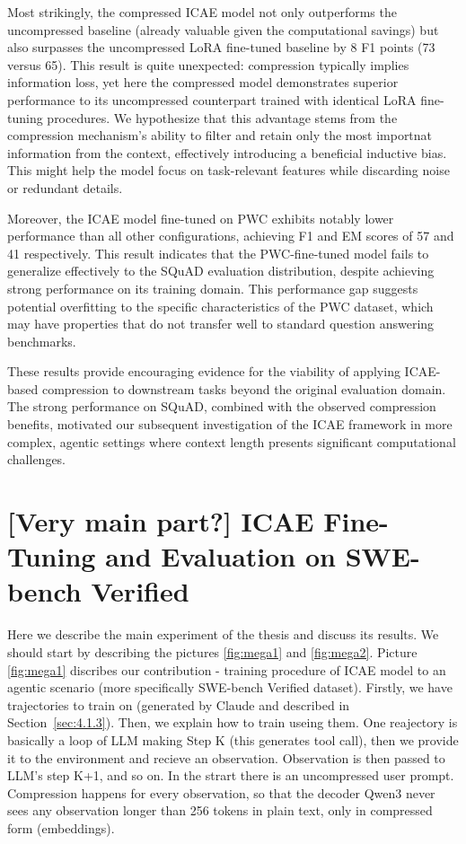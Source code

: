 Most strikingly, the compressed ICAE model not only outperforms the uncompressed baseline (already valuable given the computational savings) but also surpasses the uncompressed LoRA fine-tuned baseline by 8 F1 points (73 versus 65).
This result is quite unexpected: compression typically implies information loss, yet here the compressed model demonstrates superior performance to its uncompressed counterpart trained with identical LoRA fine-tuning procedures.
We hypothesize that this advantage stems from the compression mechanism's ability to filter and retain only the most importnat information from the context, effectively introducing a beneficial inductive bias.
This might help the model focus on task-relevant features while discarding noise or redundant details.

Moreover, the ICAE model fine-tuned on PWC exhibits notably lower performance than all other configurations, achieving F1 and EM scores of 57 and 41 respectively.
This result indicates that the PWC-fine-tuned model fails to generalize effectively to the SQuAD evaluation distribution, despite achieving strong performance on its training domain.
This performance gap suggests potential overfitting to the specific characteristics of the PWC dataset, which may have properties that do not transfer well to standard question answering benchmarks.

These results provide encouraging evidence for the viability of applying ICAE-based compression to downstream tasks beyond the original evaluation domain.
The strong performance on SQuAD, combined with the observed compression benefits, motivated our subsequent investigation of the ICAE framework in more complex, agentic settings where context length presents significant computational challenges.

\section{[Very main part?] ICAE Fine-Tuning and Evaluation on SWE-bench Verified}

Here we describe the main experiment of the thesis and discuss its results.
We should start by describing the pictures \ref{fig:mega1} and \ref{fig:mega2}.
Picture \ref{fig:mega1} discribes our contribution - training procedure of ICAE model to an agentic scenario (more specifically SWE-bench Verified dataset).
Firstly, we have trajectories to train on (generated by Claude and described in Section~\ref{sec:4.1.3}).
Then, we explain how to train useing them.
One reajectory is basically a loop of LLM making Step K (this generates tool call), then we provide it to the environment and recieve an observation. 
Observation is then passed to LLM's step K+1, and so on.
In the strart there is an uncompressed user prompt.
Compression happens for every observation, so that the decoder Qwen3 never sees any observation longer than 256 tokens in plain text, only in compressed form (embeddings).


